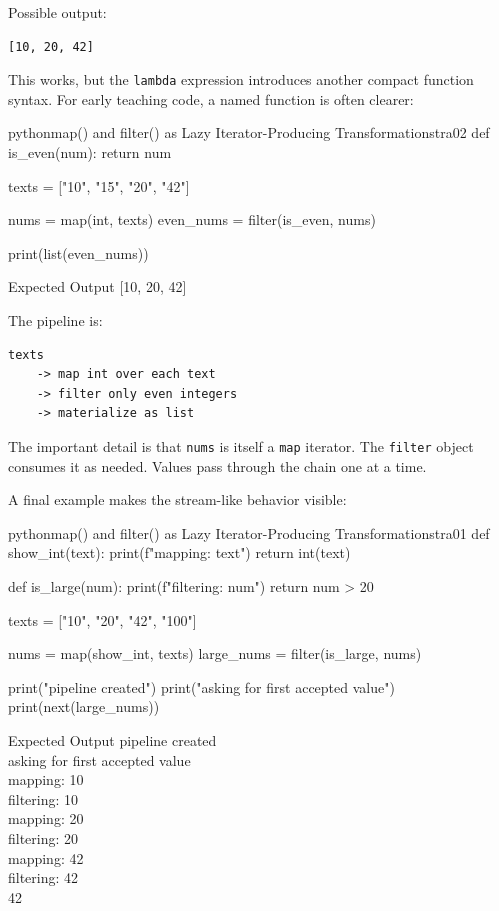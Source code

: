 Possible output:

\begin{verbatim}
[10, 20, 42]
\end{verbatim}

This works, but the \texttt{lambda} expression introduces another compact function syntax. For early teaching code, a named function is often clearer:

\begin{codebox}[]{python}{map() and filter() as Lazy Iterator-Producing Transformations}{tra02}
def is_even(num):
    return num %

texts = ["10", "15", "20", "42"]

nums = map(int, texts)
even_nums = filter(is_even, nums)

print(list(even_nums))
\end{codebox}


\begin{iobox}{Expected Output}
[10, 20, 42] \\
\end{iobox}




The pipeline is:

\begin{verbatim}
texts
    -> map int over each text
    -> filter only even integers
    -> materialize as list
\end{verbatim}

The important detail is that \texttt{nums} is itself a \texttt{map} iterator. The \texttt{filter} object consumes it as needed. Values pass through the chain one at a time.

A final example makes the stream-like behavior visible:

\begin{codebox}[]{python}{map() and filter() as Lazy Iterator-Producing Transformations}{tra01}
def show_int(text):
    print(f"mapping: {text}")
    return int(text)

def is_large(num):
    print(f"filtering: {num}")
    return num > 20

texts = ["10", "20", "42", "100"]

nums = map(show_int, texts)
large_nums = filter(is_large, nums)

print("pipeline created")
print("asking for first accepted value")
print(next(large_nums))
\end{codebox}


\begin{iobox}{Expected Output}
pipeline created \\
asking for first accepted value \\
mapping: 10 \\
filtering: 10 \\
mapping: 20 \\
filtering: 20 \\
mapping: 42 \\
filtering: 42 \\
42 \\
\end{iobox}




